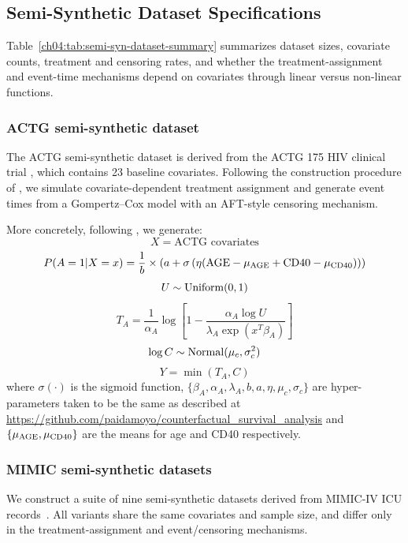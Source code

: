 
\subsection{Semi-Synthetic Dataset Specifications}\label{ch04:app:more-semi-syn-data-setup-result}

Table~\ref{ch04:tab:semi-syn-dataset-summary} summarizes dataset sizes, covariate counts, treatment and censoring rates, and whether the treatment-assignment and event-time mechanisms depend on covariates through linear versus non-linear functions.



\subsubsection{ACTG semi-synthetic dataset} \label{ch04:app:actg-semi-dataset}
The ACTG semi-synthetic dataset is derived from the ACTG 175 HIV clinical trial \citep{hammer1996atrial}, which contains 23 baseline covariates.
Following the construction procedure of \citet{chapfuwa2021enabling}, we simulate covariate-dependent treatment assignment and generate event times from a Gompertz--Cox model with an AFT-style censoring mechanism.

More concretely, following \citet{chapfuwa2021enabling}, we generate: 
$$X = \text{ACTG covariates}$$
$$P(A=1|X=x) = \frac{1}{b} \times \left(a + \sigma\left( \eta ({\rm AGE} - \mu_{\rm AGE} + {\rm CD40} - \mu_{\rm CD40}) \right) \right)$$
$$ U  \sim {\rm Uniform} (0, 1 )$$
$$T_A  =  \frac{1}{\alpha_A} \log \left[1 - \frac{\alpha_A \log U}{ \lambda_A  \exp\left( x ^T  \beta_A\right)  }  \right]$$
$$\log C  \sim {\rm Normal} (\mu_c, \sigma_c^2)$$
$$Y = \min(T_A, C)$$
where $\sigma(\cdot)$ is the sigmoid function, $\{ \beta_A, \alpha_A, \lambda_A, b, a, \eta, \mu_c, \sigma_c \}$ are hyper-parameters taken to be the same as described at \url{https://github.com/paidamoyo/counterfactual_survival_analysis} and $\{\mu_{\rm AGE},  \mu_{\rm CD40}\}$ are the means for age and CD40 respectively.

\subsubsection{MIMIC semi-synthetic datasets}
\label{ch04:app:mimic-suite}

{\raggedright We construct a suite of nine semi-synthetic datasets derived from MIMIC-IV ICU records~\citep{johnson2023mimic}. All variants share the same covariates and sample size, and differ only in the treatment-assignment and event/censoring mechanisms.\par}

